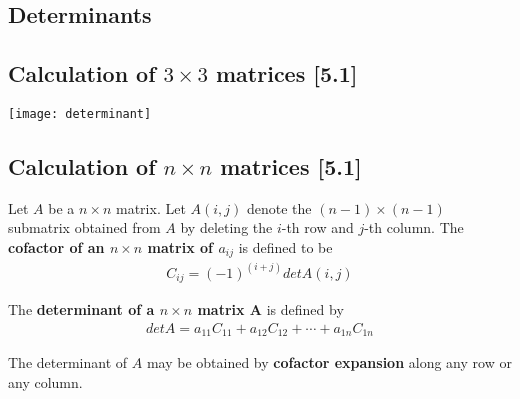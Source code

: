 \documentclass[a4paper,9pt]{extarticle}
\begin{document}
\begin{multicols*}{2}





\section{Determinants}


\subsection{Calculation of $3 \times 3$ matrices [5.1]}
{\centering \texttt{[image: determinant]} \par}


\subsection{Calculation of $n \times n$ matrices [5.1]}
Let $A$ be a $n \times n$ matrix. Let $A(i,j)$ denote the $(n - 1) \times (n - 1)$ submatrix obtained from $A$ by deleting the $i$-th row and $j$-th column. The \textbf{cofactor of an $n \times n$ matrix of $a_{ij}$} is defined to be
\begin{equation} \label{5.1-1}
    \begin{split}
        C_{ij} = (-1)^{(i + j)} det A(i, j)
    \end{split}
\end{equation}

The \textbf{determinant of a $n \times n$ matrix A} is defined by
\begin{equation} \label{5.1-2}
    \begin{split}
        det A = a_{11} C_{11} + a_{12} C_{12} + \cdots + a_{1n} C_{1n}
    \end{split}
\end{equation}

The determinant of $A$ may be obtained by \textbf{cofactor expansion} along any row or any column.


\end{multicols*}
\end{document}
